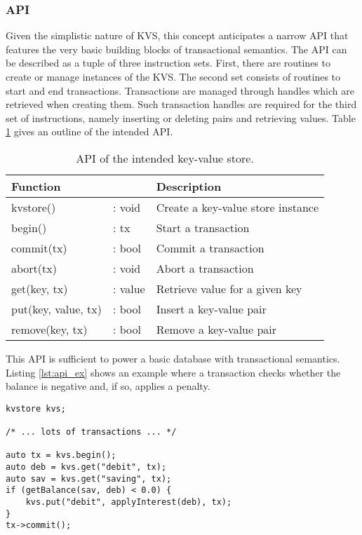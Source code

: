 \subsubsection{API}

Given the simplistic nature of \ac{KVS}, this concept anticipates a narrow
\ac{API} that features the very basic building blocks of transactional
semantics. The \ac{API} can be described as a tuple of three instruction sets.
First, there are routines to create or manage instances of the \ac{KVS}. The
second set consists of routines to start and end transactions. Transactions are
managed through handles which are retrieved when creating them. Such transaction
handles are required for the third set of instructions, namely inserting or
deleting pairs and retrieving values. Table \ref{tab:api} gives an outline of
the intended \ac{API}.

\begin{table}[!ht]
    \centering
    \begin{tabular}{|ll|l|}
        \hline
        \textbf{Function}          &  & \textbf{Description} \\
        \hline
        kvstore()           & : void  & Create a key-value store instance \\
        begin()             & : tx    & Start a transaction \\
        commit(tx)          & : bool  & Commit a transaction \\
        abort(tx)           & : void  & Abort a transaction \\
        get(key, tx)        & : value & Retrieve value for a given key \\
        put(key, value, tx) & : bool  & Insert a key-value pair \\
        remove(key, tx)     & : bool  & Remove a key-value pair \\
        \hline
    \end{tabular}
    \caption{API of the intended key-value store.}
    \label{tab:api}
\end{table}

This \ac{API} is sufficient to power a basic database with transactional
semantics. Listing \ref{lst:api_ex} shows an example where a transaction checks
whether the balance is negative and, if so, applies a penalty.

\begin{lstlisting}[caption={An example program showcasing the intended API of the KVS.}, captionpos=b, label=lst:api_ex]
kvstore kvs;

/* ... lots of transactions ... */

auto tx = kvs.begin();
auto deb = kvs.get("debit", tx);
auto sav = kvs.get("saving", tx);
if (getBalance(sav, deb) < 0.0) {
	kvs.put("debit", applyInterest(deb), tx);
}
tx->commit();
\end{lstlisting}


